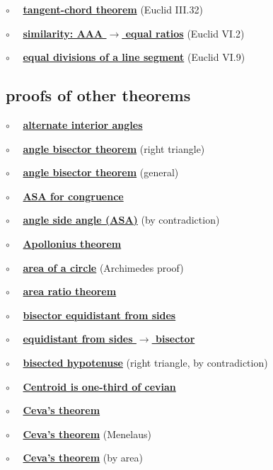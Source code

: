 \documentclass[11pt, oneside]{article}
\begin{document}
$\circ$ \ \ \hyperref[sec:tangent_chord_theorem]{\textbf{tangent-chord theorem}} (Euclid III.32)

$\circ$ \ \ \hyperref[sec:Euclid6_2]{\textbf{similarity:  AAA $\rightarrow$ equal ratios}} (Euclid VI.2)

$\circ$ \ \ \hyperref[sec:Euclid6_9]{\textbf{equal divisions of a line segment}} (Euclid VI.9)


\subsection*{proofs of other theorems}

$\circ$ \ \  \hyperref[sec:alternate_interior_angle_theorem]{\textbf{alternate interior angles}}

$\circ$ \ \ \hyperref[sec:angle_bisector_theorem]{\textbf{angle bisector theorem}} (right triangle)

$\circ$ \ \ \hyperref[sec:generalized_angle_bisector_theorem]{\textbf{angle bisector theorem}} (general)

$\circ$ \ \ \hyperref[sec:ASA]{\textbf{ASA for congruence}}

$\circ$ \ \ \hyperref[sec:ASA_contradiction]{\textbf{angle side angle (ASA)}} (by contradiction)

$\circ$ \ \ \hyperref[sec:Apollonius_theorem]{\textbf{Apollonius theorem}}

$\circ$ \ \ \hyperref[sec:circle_area_Archimedes]{\textbf{area of a circle}} (Archimedes proof)

$\circ$ \ \ \hyperref[sec:area_ratio_theorem]{\textbf{area ratio theorem}}

$\circ$ \ \ \hyperref[sec:bisector_equidistant_sides]{\textbf{bisector equidistant from sides}}

$\circ$ \ \ \hyperref[sec:bisector_equidistant_sides_converse]{\textbf{equidistant from sides $\rightarrow$ bisector}}

$\circ$ \ \ \hyperref[sec:bisected_hypotenuse]{\textbf{bisected hypotenuse}} (right triangle, by contradiction)

$\circ$ \ \ \hyperref[sec:centroid_one_third]{\textbf{Centroid is one-third of cevian}}

$\circ$ \ \ \hyperref[sec:Ceva_theorem]{\textbf{Ceva's theorem}}

$\circ$ \ \ \hyperref[sec:ceva_by_menlaus]{\textbf{Ceva's theorem}} (Menelaus)

$\circ$ \ \ \hyperref[sec:ceva_by_area]{\textbf{Ceva's theorem}} (by area)
\end{document}
